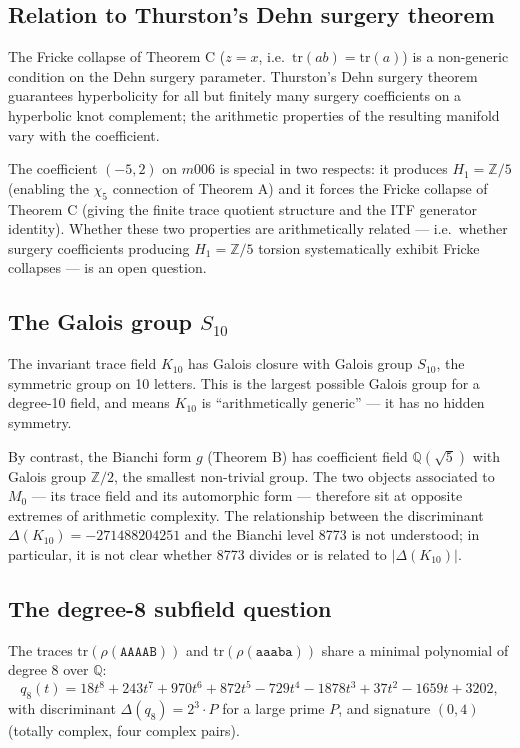\subsection{Relation to Thurston's Dehn surgery theorem}

The Fricke collapse of Theorem C ($z = x$, i.e.\ $\mathrm{tr}(ab) =
\mathrm{tr}(a)$) is a non-generic condition on the Dehn surgery parameter.
Thurston's Dehn surgery theorem \cite{Thurston} guarantees hyperbolicity
for all but finitely many surgery coefficients on a hyperbolic knot complement;
the arithmetic properties of the resulting manifold vary with the coefficient.

The coefficient $(-5,2)$ on $m006$ is special in two respects:
it produces $H_1 = \mathbb{Z}/5$ (enabling the $\chi_5$ connection of
Theorem A) and it forces the Fricke collapse of Theorem C (giving the
finite trace quotient structure and the ITF generator identity).
Whether these two properties are arithmetically related — i.e.\ whether
surgery coefficients producing $H_1 = \mathbb{Z}/5$ torsion systematically
exhibit Fricke collapses — is an open question.

\subsection{The Galois group $S_{10}$}

The invariant trace field $K_{10}$ has Galois closure with Galois group
$S_{10}$, the symmetric group on 10 letters. This is the largest possible
Galois group for a degree-10 field, and means $K_{10}$ is ``arithmetically
generic'' — it has no hidden symmetry.

By contrast, the Bianchi form $g$ (Theorem B) has coefficient field
$\mathbb{Q}(\sqrt{5})$ with Galois group $\mathbb{Z}/2$, the smallest
non-trivial group. The two objects associated to $M_0$ — its trace field
and its automorphic form — therefore sit at opposite extremes of arithmetic
complexity. The relationship between the discriminant $\Delta(K_{10}) =
-271488204251$ and the Bianchi level 8773 is not understood; in particular,
it is not clear whether 8773 divides or is related to $|\Delta(K_{10})|$.

\subsection{The degree-8 subfield question}

The traces $\mathrm{tr}(\rho(\mathtt{AAAAB}))$ and
$\mathrm{tr}(\rho(\mathtt{aaaba}))$ share a minimal polynomial of degree 8
over $\mathbb{Q}$:
\[
  q_8(t) = 18t^8 + 243t^7 + 970t^6 + 872t^5 - 729t^4 - 1878t^3 + 37t^2 - 1659t + 3202,
\]
with discriminant $\Delta(q_8) = 2^3 \cdot P$ for a large prime $P$, and
signature $(0, 4)$ (totally complex, four complex pairs).

